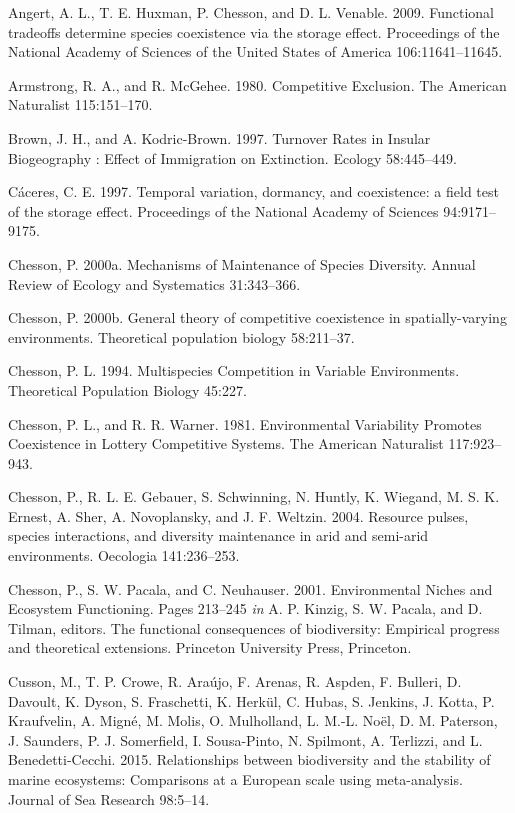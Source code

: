 \documentclass[12pt,]{article}
\begin{document}
Angert, A. L., T. E. Huxman, P. Chesson, and D. L. Venable. 2009.
Functional tradeoffs determine species coexistence via the storage
effect. Proceedings of the National Academy of Sciences of the United
States of America 106:11641--11645.

Armstrong, R. A., and R. McGehee. 1980. Competitive Exclusion. The
American Naturalist 115:151--170.

Brown, J. H., and A. Kodric-Brown. 1997. Turnover Rates in Insular
Biogeography : Effect of Immigration on Extinction. Ecology 58:445--449.

C{á}ceres, C. E. 1997. Temporal variation, dormancy, and coexistence: a
field test of the storage effect. Proceedings of the National Academy of
Sciences 94:9171--9175.

Chesson, P. 2000a. Mechanisms of Maintenance of Species Diversity.
Annual Review of Ecology and Systematics 31:343--366.

Chesson, P. 2000b. General theory of competitive coexistence in
spatially-varying environments. Theoretical population biology
58:211--37.

Chesson, P. L. 1994. Multispecies Competition in Variable Environments.
Theoretical Population Biology 45:227.

Chesson, P. L., and R. R. Warner. 1981. Environmental Variability
Promotes Coexistence in Lottery Competitive Systems. The American
Naturalist 117:923--943.

Chesson, P., R. L. E. Gebauer, S. Schwinning, N. Huntly, K. Wiegand, M.
S. K. Ernest, A. Sher, A. Novoplansky, and J. F. Weltzin. 2004. Resource
pulses, species interactions, and diversity maintenance in arid and
semi-arid environments. Oecologia 141:236--253.

Chesson, P., S. W. Pacala, and C. Neuhauser. 2001. Environmental Niches
and Ecosystem Functioning. Pages 213--245 \emph{in} A. P. Kinzig, S. W.
Pacala, and D. Tilman, editors. The functional consequences of
biodiversity: Empirical progress and theoretical extensions. Princeton
University Press, Princeton.

Cusson, M., T. P. Crowe, R. Ara{ú}jo, F. Arenas, R. Aspden, F. Bulleri,
D. Davoult, K. Dyson, S. Fraschetti, K. Herk{ü}l, C. Hubas, S. Jenkins,
J. Kotta, P. Kraufvelin, A. Mign{é}, M. Molis, O. Mulholland, L. M.-L.
No{ë}l, D. M. Paterson, J. Saunders, P. J. Somerfield, I. Sousa-Pinto,
N. Spilmont, A. Terlizzi, and L. Benedetti-Cecchi. 2015. Relationships
between biodiversity and the stability of marine ecosystems: Comparisons
at a European scale using meta-analysis. Journal of Sea Research
98:5--14.
\end{document}
